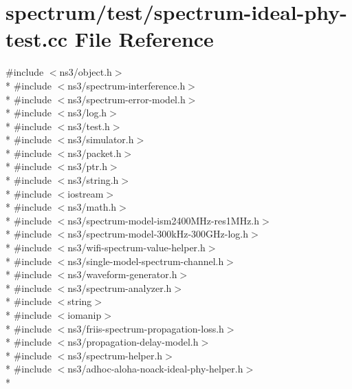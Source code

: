 \hypertarget{spectrum-ideal-phy-test_8cc}{}\section{spectrum/test/spectrum-\/ideal-\/phy-\/test.cc File Reference}
\label{spectrum-ideal-phy-test_8cc}
{\ttfamily \#include $<$ns3/object.\+h$>$}\\*
{\ttfamily \#include $<$ns3/spectrum-\/interference.\+h$>$}\\*
{\ttfamily \#include $<$ns3/spectrum-\/error-\/model.\+h$>$}\\*
{\ttfamily \#include $<$ns3/log.\+h$>$}\\*
{\ttfamily \#include $<$ns3/test.\+h$>$}\\*
{\ttfamily \#include $<$ns3/simulator.\+h$>$}\\*
{\ttfamily \#include $<$ns3/packet.\+h$>$}\\*
{\ttfamily \#include $<$ns3/ptr.\+h$>$}\\*
{\ttfamily \#include $<$ns3/string.\+h$>$}\\*
{\ttfamily \#include $<$iostream$>$}\\*
{\ttfamily \#include $<$ns3/math.\+h$>$}\\*
{\ttfamily \#include $<$ns3/spectrum-\/model-\/ism2400\+M\+Hz-\/res1\+M\+Hz.\+h$>$}\\*
{\ttfamily \#include $<$ns3/spectrum-\/model-\/300k\+Hz-\/300\+G\+Hz-\/log.\+h$>$}\\*
{\ttfamily \#include $<$ns3/wifi-\/spectrum-\/value-\/helper.\+h$>$}\\*
{\ttfamily \#include $<$ns3/single-\/model-\/spectrum-\/channel.\+h$>$}\\*
{\ttfamily \#include $<$ns3/waveform-\/generator.\+h$>$}\\*
{\ttfamily \#include $<$ns3/spectrum-\/analyzer.\+h$>$}\\*
{\ttfamily \#include $<$string$>$}\\*
{\ttfamily \#include $<$iomanip$>$}\\*
{\ttfamily \#include $<$ns3/friis-\/spectrum-\/propagation-\/loss.\+h$>$}\\*
{\ttfamily \#include $<$ns3/propagation-\/delay-\/model.\+h$>$}\\*
{\ttfamily \#include $<$ns3/spectrum-\/helper.\+h$>$}\\*
{\ttfamily \#include $<$ns3/adhoc-\/aloha-\/noack-\/ideal-\/phy-\/helper.\+h$>$}\\*
